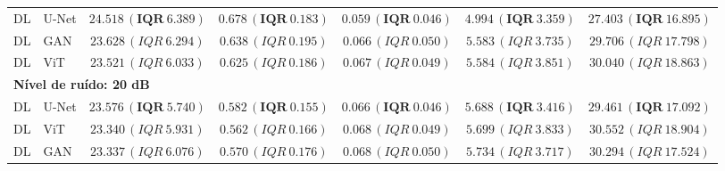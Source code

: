 \begin{table}[htbp]
{\begin{tabular}{llccccc}
DL & U-Net & $\mathbf{24.518\,(IQR\ 6.389)}$ & $\mathbf{0.678\,(IQR\ 0.183)}$ & $\mathbf{0.059\,(IQR\ 0.046)}$ & $\mathbf{4.994\,(IQR\ 3.359)}$ & $\mathbf{27.403\,(IQR\ 16.895)}$ \\
DL & GAN & $23.628\,(IQR\ 6.294)$ & $0.638\,(IQR\ 0.195)$ & $0.066\,(IQR\ 0.050)$ & $5.583\,(IQR\ 3.735)$ & $29.706\,(IQR\ 17.798)$ \\
DL & ViT & $23.521\,(IQR\ 6.033)$ & $0.625\,(IQR\ 0.186)$ & $0.067\,(IQR\ 0.049)$ & $5.584\,(IQR\ 3.851)$ & $30.040\,(IQR\ 18.863)$ \\
\midrule
\multicolumn{7}{l}{\textbf{Nível de ruído: 20 dB}} \\
DL & U-Net & $\mathbf{23.576\,(IQR\ 5.740)}$ & $\mathbf{0.582\,(IQR\ 0.155)}$ & $\mathbf{0.066\,(IQR\ 0.046)}$ & $\mathbf{5.688\,(IQR\ 3.416)}$ & $\mathbf{29.461\,(IQR\ 17.092)}$ \\
DL & ViT & $23.340\,(IQR\ 5.931)$ & $0.562\,(IQR\ 0.166)$ & $0.068\,(IQR\ 0.049)$ & $5.699\,(IQR\ 3.833)$ & $30.552\,(IQR\ 18.904)$ \\
DL & GAN & $23.337\,(IQR\ 6.076)$ & $0.570\,(IQR\ 0.176)$ & $0.068\,(IQR\ 0.050)$ & $5.734\,(IQR\ 3.717)$ & $30.294\,(IQR\ 17.524)$ \\
\bottomrule
\end{tabular}
}
\end{table}
